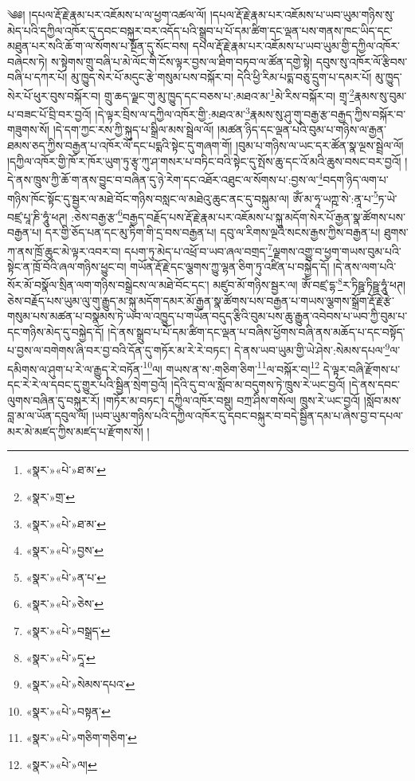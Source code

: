 ༄༅། །དཔལ་རྡོ་རྗེ་རྣམ་པར་འཇོམས་པ་ལ་ཕྱག་འཚལ་ལོ། །དཔལ་རྡོ་རྗེ་རྣམ་པར་འཇོམས་པ་ཡབ་ཡུམ་གཉིས་སུ་མེད་པའི་དཀྱིལ་འཁོར་དུ་དབང་བསྐུར་བར་འདོད་པའི་སྒྲུབ་པ་པོ་དམ་ཚིག་དང་ལྡན་པས་གནས་ཁང་ཡིད་དང་མཐུན་པར་སའི་ཆོ་ག་ལ་སོགས་པ་སྔོན་དུ་སོང་བས། དཔལ་རྡོ་རྗེ་རྣམ་པར་འཇོམས་པ་ཡབ་ཡུམ་གྱི་དཀྱིལ་འཁོར་བཞེངས་ཏེ། ས་སྟེགས་གྲུ་བཞི་པ་མེ་ལོང་གི་ངོས་ལྟར་བྱས་ལ་ཐིག་བཏབ་ལ་ཚོན་དགྱེ་སྟེ། དབུས་སུ་འཁོར་ལོ་རྩིབས་བཞི་པ་དཀར་པོ། མུ་ཁྱུད་སེར་པོ་མདུང་རྩེ་གསུམ་པས་བསྐོར་བ། དེའི་ཕྱི་རིམ་པདྨ་བཅུ་དྲུག་པ་དམར་པོ། མུ་ཁྱུད་སེར་པོ་ཕུར་བུས་བསྐོར་བ། གྲུ་ཆད་ལྗང་གུ་མུ་ཁྱུད་དང་བཅས་པ་:མཐའ་མ་\footnote{«སྣར་»«པེ་»ཐ་མ་}མེ་རིས་བསྐོར་བ། གྲྭ་\footnote{«སྣར་»གྲ་}རྣམས་སུ་བུམ་པ་བཟང་པོ་བྲི་བར་བྱའོ། །དེ་ལྟར་བྲིས་ལ་དཀྱིལ་འཁོར་གྱི་:མཐའ་མ་\footnote{«སྣར་»«པེ་»ཐ་མ་}རྣམས་སུ་ཤུ་གུ་བརྒྱ་རྩ་བརྒྱད་ཀྱིས་བསྐོར་བ་གཟུགས་སོ། །དེ་དག་ཀྱང་རས་ཀྱི་སྐུད་པ་སྒྲིལ་མས་སྦྲེལ་ལོ། །མཚན་ཉིད་དང་ལྡན་པའི་བུམ་པ་གཉིས་ལ་རྒྱན་ཐམས་ཅད་ཀྱིས་བརྒྱན་པ་འཁོར་ལོ་དང་པདྨའི་སྟེང་དུ་གཞག་གོ། །བུམ་པ་གཉིས་ལ་ཡང་དར་ཚོན་སྣ་ལྔས་སྦྲེལ་ལོ། །དཀྱིལ་འཁོར་གྱི་ཁོ་ར་ཁོར་ཡུག་ཏུ་རྩྭ་ཀུ་ཤ་གསར་པ་བཏིང་བའི་སྟེང་དུ་སྤོས་ཆུ་དང་འོ་མའི་ཆུས་བསང་བར་བྱའོ། །དེ་ནས་ཁྲུས་ཀྱི་ཆོ་ག་ནས་བྱུང་བ་བཞིན་དུ་ཉེ་རེག་དང་འཐོར་འཐུང་ལ་སོགས་པ་:བྱས་ལ་\footnote{«སྣར་»«པེ་»བྱས་}བདག་ཉིད་ལག་པ་གཉིས་ཁོང་སྟོང་དུ་སྦྱར་ལ་མཐེ་བོང་གཉིས་བསླང་ལ་མཐེའུ་ཆུང་ནང་དུ་བསྐུམ་ལ། ཨོཾ་མ་ཧཱ་ཡཀྵ་སེ་:ནཱ་པ་\footnote{«སྣར་»«པེ་»ན་པ་}ཏ་ཡེ་བཛྲ་པཱ་ཎི་ཧཱུཾ་ཕཊ། :ཅེས་བརྒྱ་རྩ་\footnote{«སྣར་»«པེ་»ཅེས་}བརྒྱད་བརྗོད་པས་རྡོ་རྗེ་རྣམ་པར་འཇོམས་པ་སྐུ་མདོག་སེར་པོ་རྒྱན་སྣ་ཚོགས་པས་བརྒྱན་པ། དར་གྱི་ཅོད་པན་དང་མུ་ཏིག་གི་དྲ་བས་བརྒྱན་པ། དབུ་ལ་རིགས་ལྔའི་སངས་རྒྱས་ཀྱིས་བརྒྱན་པ། ཐུགས་ཀ་ནས་ཁྲོ་ཆུང་མེ་ལྟར་འབར་བ། དཔག་ཏུ་མེད་པ་འཕྲོ་བ་ཡབ་ཞལ་བགྲད་\footnote{«སྣར་»«པེ་»བསྒྲད་}ལྗགས་འགྱུ་བ་ཕྱག་གཡས་བུམ་པའི་སྟེང་ན་ཁྲོ་བོའི་ཞལ་གཉིས་ཕྱུང་བ། གཡོན་རྡོ་རྗེ་དང་ལྕགས་ཀྱུ་ལྷན་ཅིག་ཏུ་འཛིན་པ་བསྐྱེད་དོ། །དེ་ནས་ལག་པའི་སོར་མོ་བསྣོལ་སྲིན་ལག་གཉིས་བསྒྲེངས་ལ་མཐེ་བོང་དང་། མཛུབ་མོ་གཉིས་སྦྱར་ལ། ཨོཾ་བཛྲ་དྷ་\footnote{«སྣར་»«པེ་»དཱ་}ར་ཏིཥྛ་ཏིཥྛ་ཧཱུཾ་ཕཊ། ཅེས་བརྗོད་པས་ཡུམ་ལུ་གུ་རྒྱུད་མ་སྐུ་མདོག་དམར་མོ་རྒྱན་སྣ་ཚོགས་པས་བརྒྱན་པ་གཡས་ལྕགས་སྒྲོག་རྡོ་རྗེ་རྩེ་གསུམ་པས་མཚན་པ་བསྣམས་ཏེ་ཡབ་ལ་འཁྱུད་པ་གཡོན་བདུད་རྩིའི་བུམ་པས་ཆུ་རྒྱུན་འབེབས་པ་ཡབ་ཀྱི་བུམ་པ་དང་གཉིས་མེད་དུ་བསྐྱེད་དོ། །དེ་ནས་སྒྲུབ་པ་པོ་དམ་ཚིག་དང་ལྡན་པ་བཞིས་ཕྱོགས་བཞི་ནས་མཆོད་པ་དང་བསྟོད་པ་བྱས་ལ་བགེགས་ཞི་བར་བྱ་བའི་དོན་དུ་གཏོར་མ་རེ་རེ་བཏང་། དེ་ནས་ཡབ་ཡུམ་གྱི་ཡེ་ཤེས་:སེམས་དཔལ་\footnote{«སྣར་»«པེ་»སེམས་དཔའ་}ལ་དམིགས་ལ་ཤུག་པ་རེ་ལ་རྒྱུད་རེ་བཏོན་\footnote{«སྣར་»«པེ་»བསྟན་}ལ། གཡས་ན་ས་:གཅིག་ཅིག་\footnote{«སྣར་»«པེ་»གཅིག་གཅིག་}ལ་བསྐོར་བ།\footnote{«སྣར་»«པེ་»ལ།} དེ་ལྟར་བཞི་རྫོགས་པ་དང་རེ་རེ་ལ་དབང་དུ་གྱུར་པའི་སྦྱིན་སྲེག་བྱའོ། །དེའི་དུ་བ་ལ་སློབ་མ་བདུགས་ཏེ་ཁྲུས་རེ་ཡང་བྱའོ། །དེ་ནས་དབང་ལུགས་བཞིན་དུ་བསྐུར་རོ། །གཏོར་མ་བཏང་། དཀྱིལ་འཁོར་བསྡུ། བཀྲ་ཤིས་གསོལ། ཁྲུས་རེ་ཡང་བྱའོ། །སློབ་མས་བླ་མ་ལ་ཡོན་དབུལ་ལོ། །ཡབ་ཡུམ་གཉིས་པའི་དཀྱིལ་འཁོར་དུ་དབང་བསྐུར་བ་བདེ་སྦྱིན་དམ་པ་ཞེས་བྱ་བ་དཔལ་མར་མེ་མཛད་ཀྱིས་མཛད་པ་རྫོགས་སོ། ། 